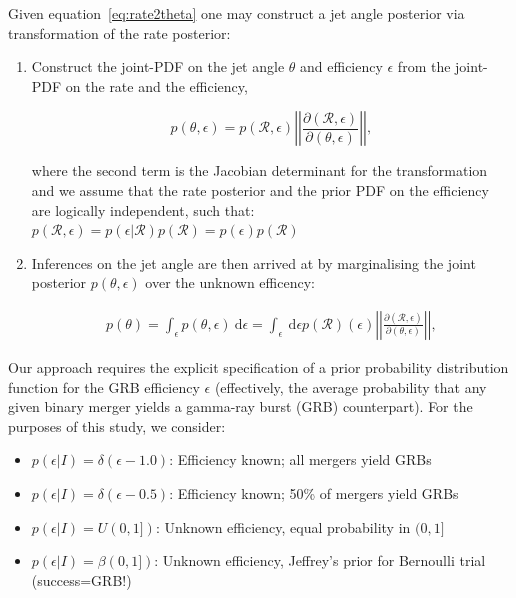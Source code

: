 \documentclass[a0,landscape]{a0poster}
\newcommand{\grbrate}{{{\mathcal R}_{\mathrm{grb}}}}
\newcommand{\cbcrate}{{{\mathcal R}}}
\newcommand{\diff}{{\mathrm d}}
\def\grb#1{gamma-ray burst#1 (GRB#1)\gdef\grb{GRB}}
\begin{document}
\begin{multicols}{4}
Given equation~\ref{eq:rate2theta} one may construct a jet angle posterior via 
transformation of the rate posterior:
\begin{enumerate}
    \item Construct the joint-PDF on the jet angle $\theta$ and efficiency
        $\epsilon$ from the joint-PDF on the rate and the efficiency,

    \begin{equation}
    p(\theta,\epsilon) = p(\cbcrate,\epsilon)
    \left\lvert\left\lvert
    \frac{\partial(\cbcrate,\epsilon)}{\partial(\theta,\epsilon)}
    \right\rvert\right\rvert,
    \end{equation}

    where the second term is the Jacobian determinant for the transformation and
    we assume that the rate posterior and the prior PDF on the efficiency are
    logically independent, such that:
        $p(\cbcrate, \epsilon) =  p(\epsilon|\cbcrate)p(\cbcrate) =
        p(\epsilon)p(\cbcrate)$

    \item Inferences on the jet angle are then arrived at by marginalising the joint
        posterior $p(\theta,\epsilon)$ over the unknown efficency:

        \begin{eqnarray}
        p(\theta) = \int_{\epsilon} p(\theta,\epsilon)~\diff \epsilon =
        \int_{\epsilon} ~\diff \epsilon p(\cbcrate)(\epsilon)
            \left\lvert\left\lvert
            \frac{\partial(\cbcrate,\epsilon)}{\partial(\theta,\epsilon)}
            \right\rvert\right\rvert,
        \end{eqnarray}

\end{enumerate}

Our approach requires the explicit specification of a prior probability
distribution function for the GRB efficiency $\epsilon$ (effectively, the
average probability that any given binary merger yields a \grb{} counterpart).
For the purposes of this study, we consider:
\begin{itemize}
    \item $p(\epsilon|I) = \delta(\epsilon-1.0)$: Efficiency known; all mergers
        yield \grb{s}
    \item $p(\epsilon|I) = \delta(\epsilon-0.5)$: Efficiency known; 50\% of
        mergers yield \grb{s}
    \item $p(\epsilon|I) = U(0,1])$: Unknown efficiency, equal probability in
        $(0,1]$
    \item $p(\epsilon|I) = \beta(0,1])$: Unknown efficiency, Jeffrey's prior for
        Bernoulli trial (success=\grb{}!)
\end{itemize}


\end{multicols}
\end{document}
